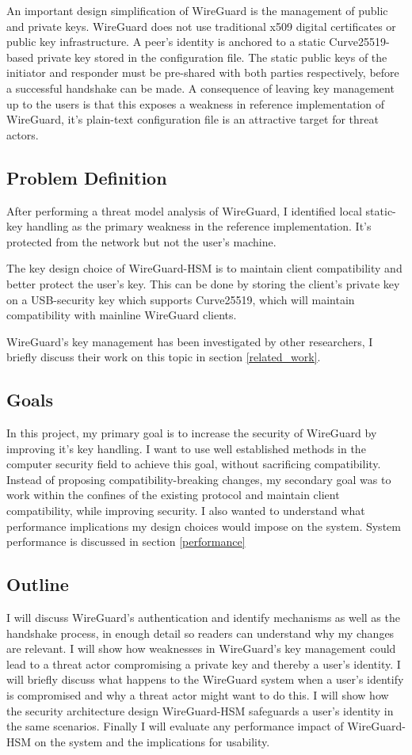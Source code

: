 \documentclass [11pt, proquest] {uwthesis}[2020/02/24]
\begin{document}
An important design simplification of WireGuard is the management of public and private keys. WireGuard does not use traditional x509 digital certificates or public key infrastructure. A peer's identity is anchored to a static Curve25519-based private key stored in the configuration file.
The static public keys of the initiator and responder must be pre-shared with both parties respectively, before a successful handshake can be made. 
A consequence of leaving key management up to the users is that this exposes a weakness in reference implementation of WireGuard, it's plain-text configuration file is an attractive target for threat actors.

\subsection{Problem Definition} \label{problem_definition}
After performing a threat model analysis of WireGuard, I identified local static-key handling as the primary weakness in the reference implementation. It's protected from the network but not the user's machine.

The key design choice of WireGuard-HSM is to maintain client compatibility and better protect the user's key. This can be done by storing the client's private key on a USB-security key which supports Curve25519, which will maintain compatibility with mainline WireGuard clients. 

WireGuard's key management has been investigated by other researchers, I briefly discuss their work on this topic in section \ref{related_work}.

\subsection{Goals}
In this project, my primary goal is to increase the security of WireGuard by improving it's key handling. I want to use well established methods in the computer security field to achieve this goal, without sacrificing compatibility. Instead of proposing compatibility-breaking changes, my secondary goal was to work within the confines of the existing protocol and maintain client compatibility, while improving security. I also wanted to understand what performance implications my design choices would impose on the system. System performance is discussed in section \ref{performance}

\subsection{Outline}
I will discuss WireGuard's authentication and identify mechanisms as well as the handshake process, in enough detail so readers can understand why my changes are relevant.
I will show how weaknesses in WireGuard's key management could lead to a threat actor compromising a private key and thereby a user's identity. 
I will briefly discuss what happens to the WireGuard system when a user's identify is compromised and why a threat actor might want to do this.
I will show how the security architecture design WireGuard-HSM safeguards a user's identity in the same scenarios.
Finally I will evaluate any performance impact of WireGuard-HSM on the system and the implications for usability.
\end{document}
